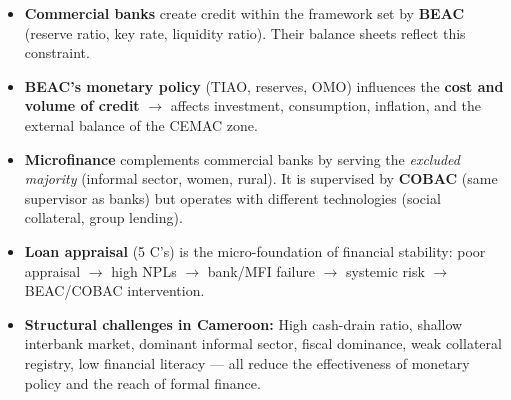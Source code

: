 \documentclass[11pt]{article}
\begin{document}
\begin{aretenir}
\begin{itemize}
\item \textbf{Commercial banks} create credit within the framework set by \textbf{BEAC} (reserve ratio, key rate, liquidity ratio). Their balance sheets reflect this constraint.
\item \textbf{BEAC's monetary policy} (TIAO, reserves, OMO) influences the \textbf{cost and volume of credit} $\rightarrow$ affects investment, consumption, inflation, and the external balance of the CEMAC zone.
\item \textbf{Microfinance} complements commercial banks by serving the \emph{excluded majority} (informal sector, women, rural). It is supervised by \textbf{COBAC} (same supervisor as banks) but operates with different technologies (social collateral, group lending).
\item \textbf{Loan appraisal} (5 C's) is the micro-foundation of financial stability: poor appraisal $\rightarrow$ high NPLs $\rightarrow$ bank/MFI failure $\rightarrow$ systemic risk $\rightarrow$ BEAC/COBAC intervention.
\item \textbf{Structural challenges in Cameroon:} High cash-drain ratio, shallow interbank market, dominant informal sector, fiscal dominance, weak collateral registry, low financial literacy — all reduce the effectiveness of monetary policy and the reach of formal finance.
\end{itemize}
\end{aretenir}
\end{document}
